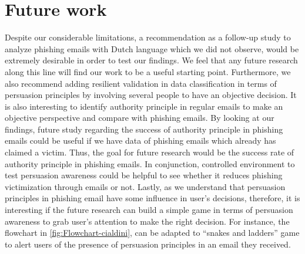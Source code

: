 \section{\label{sec:Future-work}Future work}

Despite our considerable limitations, a recommendation as a follow-up
study to analyze phishing emails with Dutch language which we did
not observe, would be extremely desirable in order to test our findings.
We feel that any future research along this line will find our work
to be a useful starting point. Furthermore, we also recommend adding
resilient validation in data classification in terms of persuasion
principles by involving several people to have an objective decision.
It is also interesting to identify authority principle in regular
emails to make an objective perspective and compare with phishing
emails. By looking at our findings, future study regarding the success
of authority principle in phishing emails could be useful if we have
data of phishing emails which already has claimed a victim. Thus,
the goal for future research would be the success rate of authority
principle in phishing emails. In conjunction, controlled environment
to test persuasion awareness could be helpful to see whether it reduces
phishing victimization through emails or not. Lastly, as we understand
that persuasion principles in phishing email have some influence in
user's decisions, therefore, it is interesting if the future research
can build a simple game in terms of persuasion awareness to grab user's
attention to make the right decision. For instance, the flowchart
in \autoref{fig:Flowchart-cialdini}, can be adapted to ``snakes
and ladders'' game to alert users of the presence of persuasion principles
in an email they received.%

